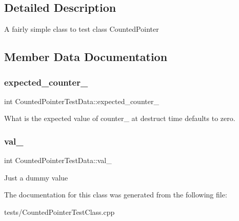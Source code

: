 \subsection{Detailed Description}
A fairly simple class to test class Counted\+Pointer 

\subsection{Member Data Documentation}
\mbox{\label{classCountedPointerTestData_a1f4fb3bcde03506e7e4e9fee0e7d71c1}} 
\subsubsection{\texorpdfstring{expected\+\_\+counter\+\_\+}{expected\_counter\_}}
{\footnotesize\ttfamily int Counted\+Pointer\+Test\+Data\+::expected\+\_\+counter\+\_\+}

What is the expected value of counter\+\_\+ at destruct time defaults to zero. \mbox{\label{classCountedPointerTestData_acb6b2ee120f84c5bf1ff4c590dd7d8c1}} 
\subsubsection{\texorpdfstring{val\+\_\+}{val\_}}
{\footnotesize\ttfamily int Counted\+Pointer\+Test\+Data\+::val\+\_\+}

Just a dummy value 

The documentation for this class was generated from the following file\+:\begin{DoxyCompactItemize}
\item 
tests/Counted\+Pointer\+Test\+Class.\+cpp\end{DoxyCompactItemize}
